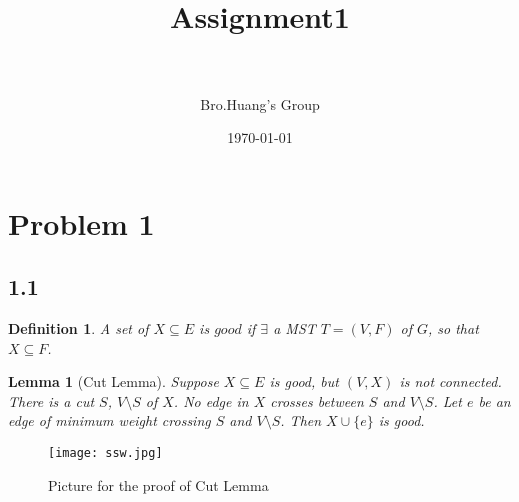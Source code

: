 \documentclass[paper=a4, fontsize=11pt]{scrartcl} %
\title{	
\normalfont \normalsize
\horrule{0.5pt} \\[0.4cm] %
\huge Assignment1 \\ %
\horrule{2pt} \\[0.5cm] %
}
\author{Bro.Huang's Group} %
\date{\normalsize\today} %
\numberwithin{figure}{section} %
\numberwithin{table}{section} %
\newtheorem{definition}{Definition}
\newtheorem*{lemma}{Lemma}
\begin{document}
\maketitle %

\section*{Problem 1}
\subsection*{1.1}
\begin{definition}
    A set of $X \subseteq E$ is $good$ if $ \exists$ a MST $T = (V, F)$ of $G$, so that $X \subseteq F$.
\end{definition}
\begin{lemma}[Cut Lemma]
    Suppose $X \subseteq E$ is good, but $(V, X)$ is not connected. There is a cut $S$, $V \setminus S$ of $X$. No edge in $X$ crosses between $S$ and $V \setminus S$. Let $e$ be an edge of minimum weight crossing $S$ and $V \setminus S$. Then $X \cup \{e\}$ is good.
\end{lemma}
\begin{figure}
\begin{center}
\texttt{[image: ssw.jpg]}
\caption{Picture for the proof of Cut Lemma}
\end{center}
\end{figure}
\end{document}
